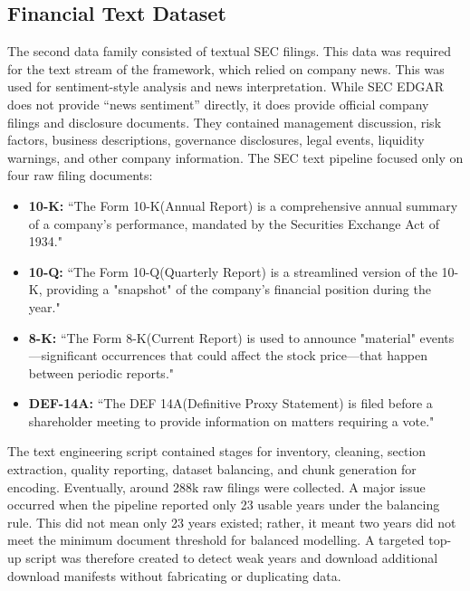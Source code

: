 \documentclass[conference]{IEEEtran}
\begin{document}
\subsection{Financial Text Dataset}
The second data family consisted of textual SEC filings. This data was required for the text stream of the framework, which relied on company news. This was used for sentiment-style analysis and news interpretation. While SEC EDGAR does not provide “news sentiment” directly, it does provide official company filings and disclosure documents. They contained management discussion, risk factors, business descriptions, governance disclosures, legal events, liquidity warnings, and other company information. The SEC text pipeline focused only on four raw filing documents:
\begin{itemize}
    \item \textbf{10-K:} ``The Form 10-K(Annual Report) is a comprehensive annual summary of a company's performance, mandated by the Securities Exchange Act of 1934."\cite{10K}
    \item \textbf{10-Q:} ``The Form 10-Q(Quarterly Report) is a streamlined version of the 10-K, providing a "snapshot" of the company's financial position during the year."\cite{10Q}
    \item \textbf{8-K:} ``The Form 8-K(Current Report) is used to announce "material" events—significant occurrences that could affect the stock price—that happen between periodic reports."\cite{8K} 
    \item \textbf{DEF-14A:} ``The DEF 14A(Definitive Proxy Statement) is filed before a shareholder meeting to provide information on matters requiring a vote."\cite{DEF14A} 
\end{itemize}

The text engineering script contained stages for inventory, cleaning, section extraction, quality reporting, dataset balancing, and chunk generation for encoding. 
Eventually, around 288k raw filings were collected. A major issue occurred when the pipeline reported only 23 usable years under the balancing rule. This did not mean only 23 years existed; rather, it meant two years did not meet the minimum document threshold for balanced modelling. A targeted top-up script was therefore created to detect weak years and download additional download manifests without fabricating or duplicating data.
\end{document}
